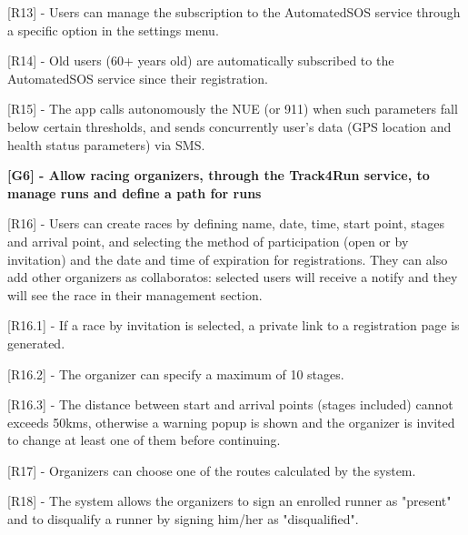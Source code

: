 [R13] - Users can manage the subscription to the AutomatedSOS service through a specific option in the settings menu. \newline

[R14] - Old users (60+ years old) are automatically subscribed to the AutomatedSOS service since their registration. \newline

[R15] - The app calls autonomously the NUE (or 911) when such parameters fall below certain thresholds, and sends concurrently user's data (GPS location and health status parameters) via SMS. \newline

\hspace{-\parindent}\textbf{[G6] - Allow racing organizers, through the Track4Run service, to manage runs and define a path for runs} \newline

[R16] - Users can create races by defining name, date, time, start point, stages and arrival point, and selecting the method of participation (open or by invitation) and the date and time of expiration for registrations. They can also add other organizers as collaboratos: selected users will receive a notify and they will see the race in their management section. \newline

\hspace{\parindent}[R16.1] - If a race by invitation is selected, a private link to a registration page is generated. \newline

\hspace{\parindent}[R16.2] - The organizer can specify a maximum of 10 stages. \newline

\hspace{\parindent}[R16.3] - The distance between start and arrival points (stages included) cannot exceeds 50kms, otherwise a warning popup is shown and the organizer is invited to change at least one of them before continuing. \newline

[R17] - Organizers can choose one of the routes calculated by the system. \newline

[R18] - The system allows the organizers to sign an enrolled runner as "present" and to disqualify a runner by signing him/her as "disqualified". \newline

